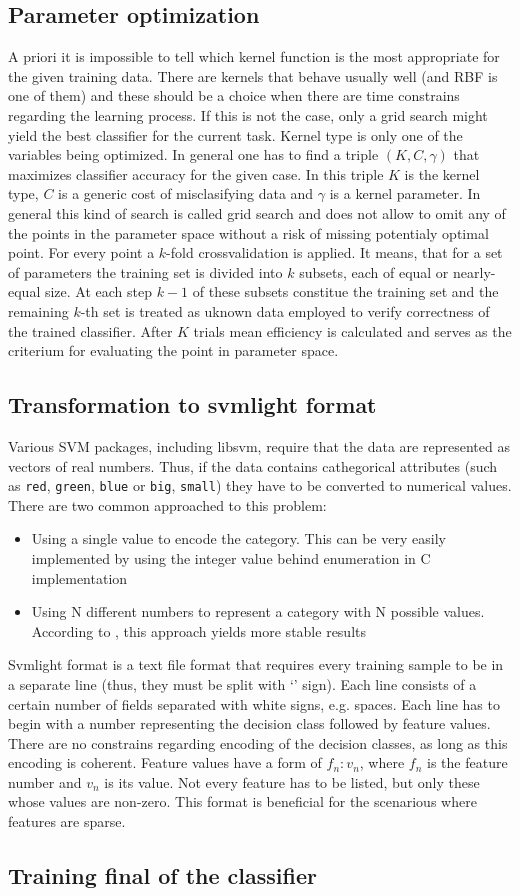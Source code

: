 \subsection{Parameter optimization}
A priori it is impossible to tell which kernel function is the most appropriate for the given training data. There are kernels that behave usually well (and RBF is one of them) and these should be a choice when there are time constrains regarding the learning process. If this is not the case, only a grid search might yield the best classifier for the current task.
\quad
Kernel type is only one of the variables being optimized. In general one has to find a triple $(K, C, \gamma)$ that maximizes classifier accuracy for the given case. In this triple $K$ is the kernel type, $C$ is a generic cost of misclasifying data and $\gamma$ is a kernel parameter. In general this kind of search is called grid search and does not allow to omit any of the points in the parameter space without a risk of missing potentialy optimal point.
\quad
For every point a $k$-fold crossvalidation is applied. It means, that for a set of parameters the training set is divided into $k$ subsets, each of equal or nearly-equal size. At each step $k-1$ of these subsets constitue the training set and the remaining $k$-th set is treated as uknown data employed to verify correctness of the trained classifier. After $K$ trials mean efficiency is calculated and serves as the criterium for evaluating the point in parameter space.
\subsection{Transformation to svmlight format}
Various SVM packages, including libsvm, require that the data are represented as vectors of real numbers. Thus, if the data contains cathegorical attributes (such as \verb+red+, \verb+green+, \verb+blue+ or \verb+big+, \verb+small+) they have to be converted to numerical values. There are two common approached to this problem:
\begin{itemize}
\item Using a single value to encode the category. This can be very easily implemented by using the integer value behind enumeration in C implementation
\item Using N different numbers to represent a category with N possible values. According to \cite{Chih-WeiHsu2010}, this approach yields more stable results
\end{itemize}
\qquad
Svmlight format is a text file format that requires every training sample to be in a separate line (thus, they must be split with `\n' sign). Each line consists of a certain number of fields separated with white signs, e.g. spaces. Each line has to begin with a number representing the decision class followed by feature values. There are no constrains regarding encoding of the decision classes, as long as this encoding is coherent. Feature values have a form of $f_n:v_n$, where $f_n$ is the feature number and $v_n$ is its value. Not every feature has to be listed, but only these whose values are non-zero. This format is beneficial for the scenarious where features are sparse.
\subsection{Training final of the classifier}
